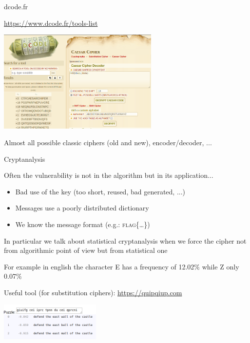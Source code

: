 \begin{frame}{dcode.fr}

\centering

\href{https://www.dcode.fr/tools-list}{https://www.dcode.fr/tools-list}

\medskip

\includegraphics[width=8cm]{img/dcode.png}

\medskip

Almost all possible classic ciphers (old and new), encoder/decoder, ...

\end{frame}
\begin{frame}{Cryptanalysis}

Often the vulnerability is not in the algorithm but in its application...

\begin{itemize}
  \item Bad use of the key (too short, reused, bad generated, ...)
  \item Messages use a poorly distributed dictionary
  \item We know the message format (e.g.: \textsc{flag\{\ldots\}})
\end{itemize}

\medskip

In particular we talk about statistical cryptanalysis when we force the cipher not from algorithmic point of view but from statistical one

\medskip

For example in english the character E has a frequency of 12.02\% while Z only 0.07\%

\medskip

Useful tool (for substitution ciphers): \href{https://quipqiup.com}{https://quipqiup.com}

\medskip

\centering\includegraphics[width=5cm]{img/quipqiup.png}
  
\end{frame}

